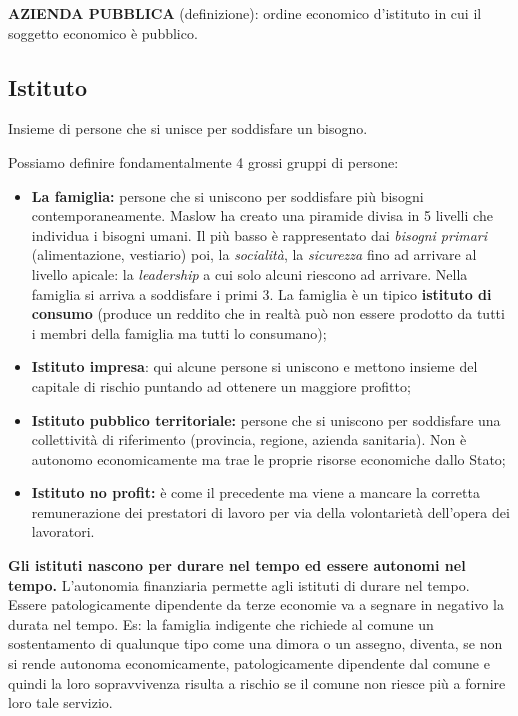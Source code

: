 \textbf{AZIENDA PUBBLICA} (definizione): ordine economico d'istituto in cui il soggetto economico è pubblico.

\subsection{Istituto}

Insieme di persone che si unisce per soddisfare un bisogno.

Possiamo definire fondamentalmente 4 grossi gruppi di persone:

\begin{itemize}
\item
  \textbf{La famiglia:} persone che si uniscono per soddisfare più
  bisogni contemporaneamente. Maslow ha creato una piramide divisa in 5
  livelli che individua i bisogni umani. Il più basso è rappresentato
  dai \emph{bisogni primari} (alimentazione, vestiario) poi, la
  \emph{socialità}, la \emph{sicurezza} fino ad arrivare al livello
  apicale: la \emph{leadership} a cui solo alcuni riescono ad arrivare.
  Nella famiglia si arriva a soddisfare i primi 3. La famiglia è un
  tipico \textbf{istituto di consumo} (produce un reddito che in realtà
  può non essere prodotto da tutti i membri della famiglia ma tutti lo
  consumano);
\item
  \textbf{Istituto impresa}: qui alcune persone si uniscono e mettono
  insieme del capitale di rischio puntando ad ottenere un maggiore
  profitto;
\item
  \textbf{Istituto pubblico territoriale:} persone che si uniscono per
  soddisfare una collettività di riferimento (provincia, regione,
  azienda sanitaria). Non è autonomo economicamente ma trae le proprie
  risorse economiche dallo Stato;
\item
  \textbf{Istituto no profit:} è come il precedente ma viene a mancare
  la corretta remunerazione dei prestatori di lavoro per via della
  volontarietà dell'opera dei lavoratori.
\end{itemize}

\textbf{Gli istituti nascono per durare nel tempo ed essere autonomi nel tempo.} L'autonomia finanziaria permette agli istituti di durare nel tempo. Essere patologicamente dipendente da terze economie va a segnare in negativo la durata nel tempo. Es: la famiglia indigente che richiede al comune un sostentamento di qualunque tipo come una dimora o un assegno, diventa, se non si rende autonoma economicamente, patologicamente dipendente dal comune e quindi la loro sopravvivenza risulta a rischio se il comune non riesce più a fornire loro tale servizio.


